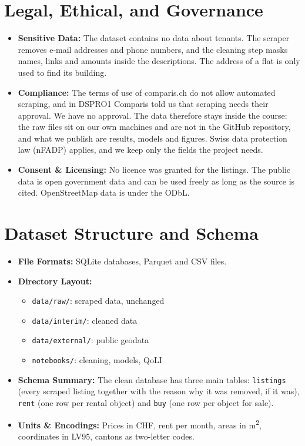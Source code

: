 \documentclass[11pt, a4paper]{article}
\begin{document}
\section{Legal, Ethical, and Governance}
\begin{itemize}
    \item \textbf{Sensitive Data:} The dataset contains no data about tenants. The scraper removes e-mail addresses and phone numbers, and the cleaning step masks names, links and amounts inside the descriptions. The address of a flat is only used to find its building.
    \item \textbf{Compliance:} The terms of use of comparis.ch do not allow automated scraping, and in DSPRO1 Comparis told us that scraping needs their approval. We have no approval. The data therefore stays inside the course: the raw files sit on our own machines and are not in the GitHub repository, and what we publish are results, models and figures. Swiss data protection law (nFADP) applies, and we keep only the fields the project needs.
    \item \textbf{Consent \& Licensing:} No licence was granted for the listings. The public data is open government data and can be used freely as long as the source is cited. OpenStreetMap data is under the ODbL.
\end{itemize}

\section{Dataset Structure and Schema}
\begin{itemize}
    \item \textbf{File Formats:} SQLite databases, Parquet and CSV files.
    \item \textbf{Directory Layout:}
    \begin{itemize}
        \item \texttt{data/raw/}: scraped data, unchanged
        \item \texttt{data/interim/}: cleaned data
        \item \texttt{data/external/}: public geodata
        \item \texttt{notebooks/}: cleaning, models, QoLI
    \end{itemize}
    \item \textbf{Schema Summary:} The clean database has three main tables: \texttt{listings} (every scraped listing together with the reason why it was removed, if it was), \texttt{rent} (one row per rental object) and \texttt{buy} (one row per object for sale).
    \item \textbf{Units \& Encodings:} Prices in CHF, rent per month, areas in m\textsuperscript{2}, coordinates in LV95, cantons as two-letter codes.
\end{itemize}
\end{document}

